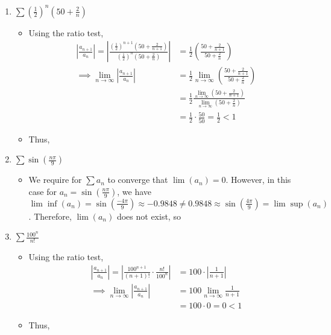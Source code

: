 \documentclass[10pt,a4paper]{article}
\theoremstyle{definition}
\begin{document}
\begin{enumerate}[label = (\alph*)]
\begin{itemize}
	\end{itemize}
\item $\displaystyle \sum \left(\frac{1}{2}\right)^n\left(50 + \frac{2}{n}\right)$
	\begin{itemize}
	\item Using the ratio test,
	\begin{align*}
	\left|\frac{a_{n+1}}{a_n}\right| = \left|\frac{\displaystyle \left(\frac{1}{2}\right)^{n+1}\left(50 + \frac{2}{n+1}\right)}{\displaystyle \left(\frac{1}{2}\right)^{n}\left(50 + \frac{2}{n}\right)}\right| &= \frac{1}{2}\left(\frac{50 + \frac{2}{n+1}}{50 + \frac{2}{n}}\right)\\
	\implies \lim_{n \to \infty} \left|\frac{a_{n+1}}{a_n}\right| &= \frac{1}{2}\lim_{n \to \infty}\left(\frac{50 + \frac{2}{n+1}}{50 + \frac{2}{n}}\right)\\
	&= \frac{1}{2}\frac{\lim_{n \to \infty}(50 + \frac{2}{n + 1})}{\lim_{n \to \infty}(50 + \frac{2}{n})}\\
	&= \frac{1}{2} \cdot \frac{50}{50} = \frac{1}{2} < 1
	\end{align*}
	\item Thus, 
	\end{itemize}
\item $\displaystyle \sum \sin\left(\frac{n\pi}{9}\right)$
	\begin{itemize}
	\item We require for $\sum a_n$ to converge that $\lim(a_n) = 0$. However, in this case for $a_n = \sin\left(\frac{n\pi}{9}\right)$, we have $\lim \inf(a_n) = \sin\left(\frac{-4\pi}{9}\right) \approx -0.9848 \neq 0.9848 \approx \sin\left(\frac{4\pi}{9}\right) = \lim \sup (a_n)$. Therefore, $\lim(a_n)$ does not exist, so 
	\end{itemize}
\item $\displaystyle \sum\frac{100^n}{n!}$
	\begin{itemize}
	\item Using the ratio test,
	\begin{align*}
	\left|\frac{a_{n+1}}{a_n}\right| = \left|\frac{100^{n + 1}}{(n+1)!} \cdot \frac{n!}{100^n}\right| &= 100 \cdot \left|\frac{1}{n + 1}\right|\\
	\implies \lim_{n \to \infty} \left|\frac{a_{n+1}}{a_n}\right| &= 100 \lim_{n \to \infty} \frac{1}{n + 1}\\
	&= 100 \cdot 0 = 0 < 1
	\end{align*}
	\item Thus, 
	\end{itemize}
\end{enumerate}
\end{document}
